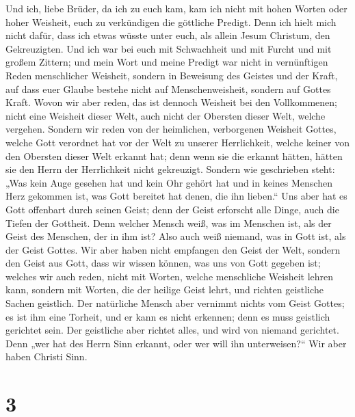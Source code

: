  Und ich, liebe Brüder, da ich zu euch kam, kam ich nicht
mit hohen Worten oder hoher Weisheit, euch zu verkündigen die göttliche
Predigt.  Denn ich hielt mich nicht dafür, dass ich etwas
wüsste unter euch, als allein Jesum Christum, den Gekreuzigten.
 Und ich war bei euch mit Schwachheit und mit Furcht und
mit großem Zittern;  und mein Wort und meine Predigt war
nicht in vernünftigen Reden menschlicher Weisheit, sondern in Beweisung
des Geistes und der Kraft,  auf dass euer Glaube bestehe
nicht auf Menschenweisheit, sondern auf Gottes Kraft. 
Wovon wir aber reden, das ist dennoch Weisheit bei den Vollkommenen;
nicht eine Weisheit dieser Welt, auch nicht der Obersten dieser Welt,
welche vergehen.  Sondern wir reden von der heimlichen,
verborgenen Weisheit Gottes, welche Gott verordnet hat vor der Welt zu
unserer Herrlichkeit,  welche keiner von den Obersten
dieser Welt erkannt hat; denn wenn sie die erkannt hätten, hätten sie
den Herrn der Herrlichkeit nicht gekreuzigt.  Sondern wie
geschrieben steht: „Was kein Auge gesehen hat und kein Ohr gehört hat
und in keines Menschen Herz gekommen ist, was Gott bereitet hat denen,
die ihn lieben.``  Uns aber hat es Gott offenbart durch
seinen Geist; denn der Geist erforscht alle Dinge, auch die Tiefen der
Gottheit.  Denn welcher Mensch weiß, was im Menschen ist,
als der Geist des Menschen, der in ihm ist? Also auch weiß niemand, was
in Gott ist, als der Geist Gottes.  Wir aber haben nicht
empfangen den Geist der Welt, sondern den Geist aus Gott, dass wir
wissen können, was uns von Gott gegeben ist;  welches wir
auch reden, nicht mit Worten, welche menschliche Weisheit lehren kann,
sondern mit Worten, die der heilige Geist lehrt, und richten geistliche
Sachen geistlich.  Der natürliche Mensch aber vernimmt
nichts vom Geist Gottes; es ist ihm eine Torheit, und er kann es nicht
erkennen; denn es muss geistlich gerichtet sein.  Der
geistliche aber richtet alles, und wird von niemand gerichtet.
 Denn „wer hat des Herrn Sinn erkannt, oder wer will ihn
unterweisen?{}`` Wir aber haben Christi Sinn.

\hypertarget{section-2}{%
\section{3}\label{section-2}}

